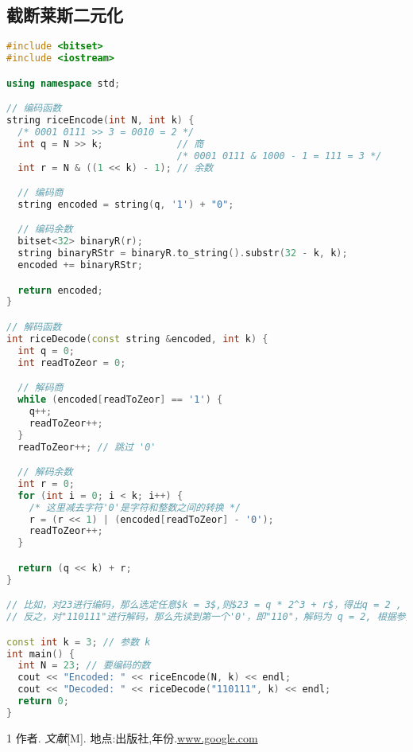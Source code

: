 \documentclass{/Users/hi/Study/template/code}
\begin{document}
\subsection{截断莱斯二元化}
\begin{lstlisting}[language=c++]
#include <bitset>
#include <iostream>

using namespace std;

// 编码函数
string riceEncode(int N, int k) {
  /* 0001 0111 >> 3 = 0010 = 2 */
  int q = N >> k;             // 商
                              /* 0001 0111 & 1000 - 1 = 111 = 3 */
  int r = N & ((1 << k) - 1); // 余数

  // 编码商
  string encoded = string(q, '1') + "0";

  // 编码余数
  bitset<32> binaryR(r);
  string binaryRStr = binaryR.to_string().substr(32 - k, k);
  encoded += binaryRStr;

  return encoded;
}

// 解码函数
int riceDecode(const string &encoded, int k) {
  int q = 0;
  int readToZeor = 0;

  // 解码商
  while (encoded[readToZeor] == '1') {
    q++;
    readToZeor++;
  }
  readToZeor++; // 跳过 '0'

  // 解码余数
  int r = 0;
  for (int i = 0; i < k; i++) {
    /* 这里减去字符'0'是字符和整数之间的转换 */
    r = (r << 1) | (encoded[readToZeor] - '0');
    readToZeor++;
  }

  return (q << k) + r;
}

// 比如，对23进行编码，那么选定任意$k = 3$,则$23 = q * 2^3 + r$，得出q = 2 , r = 7，则q = "110" , r = "111"，则编码结果为"110111"
// 反之，对"110111"进行解码，那么先读到第一个'0'，即"110"，解码为 q = 2, 根据参数k=3可知，再继续读取3位则为余数r = b'111' = 7, 故$2 * 2^3 + 7 = 23$

const int k = 3; // 参数 k
int main() {
  int N = 23; // 要编码的数
  cout << "Encoded: " << riceEncode(N, k) << endl;
  cout << "Decoded: " << riceDecode("110111", k) << endl;
  return 0;
}
\end{lstlisting}

\newpage
\begin{thebibliography}{1}
	 作者. \emph{文献}[M]. 地点:出版社,年份.\url{www.google.com}
\end{thebibliography}
\end{document}
